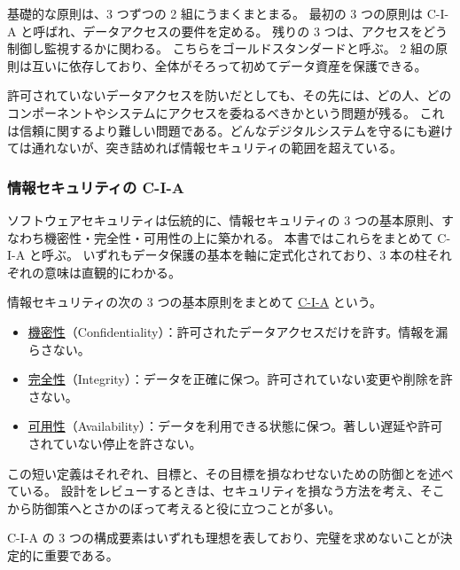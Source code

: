 \documentclass[uplatex]{jsarticle}
\def\label#1{}%
\begin{document}
基礎的な原則は、3 つずつの 2 組にうまくまとまる。
最初の 3 つの原則は C-I-A と呼ばれ、データアクセスの要件を定める。
残りの 3 つは、アクセスをどう制御し監視するかに関わる。
こちらをゴールドスタンダードと呼ぶ。
2 組の原則は互いに依存しており、全体がそろって初めてデータ資産を保護できる。

許可されていないデータアクセスを防いだとしても、その先には、どの人、どのコンポーネントやシステムにアクセスを委ねるべきかという問題が残る。
これは信頼に関するより難しい問題である。どんなデジタルシステムを守るにも避けては通れないが、突き詰めれば情報セキュリティの範囲を超えている。

\subsubsection{情報セキュリティの C-I-A}

ソフトウェアセキュリティは伝統的に、情報セキュリティの 3 つの基本原則、すなわち機密性・完全性・可用性の上に築かれる。
本書ではこれらをまとめて C-I-A と呼ぶ。
いずれもデータ保護の基本を軸に定式化されており、3 本の柱それぞれの意味は直観的にわかる。

\begin{dfn}[C-I-A]\label{dfn:ch1-cia}
情報セキュリティの次の 3 つの基本原則をまとめて \underline{C-I-A} という。
\begin{itemize}
\item \underline{機密性}（Confidentiality）：許可されたデータアクセスだけを許す。情報を漏らさない。
\item \underline{完全性}（Integrity）：データを正確に保つ。許可されていない変更や削除を許さない。
\item \underline{可用性}（Availability）：データを利用できる状態に保つ。著しい遅延や許可されていない停止を許さない。
\end{itemize}
\end{dfn}

この短い定義はそれぞれ、目標と、その目標を損なわせないための防御とを述べている。
設計をレビューするときは、セキュリティを損なう方法を考え、そこから防御策へとさかのぼって考えると役に立つことが多い。

C-I-A の 3 つの構成要素はいずれも理想を表しており、完璧を求めないことが決定的に重要である。
\end{document}
